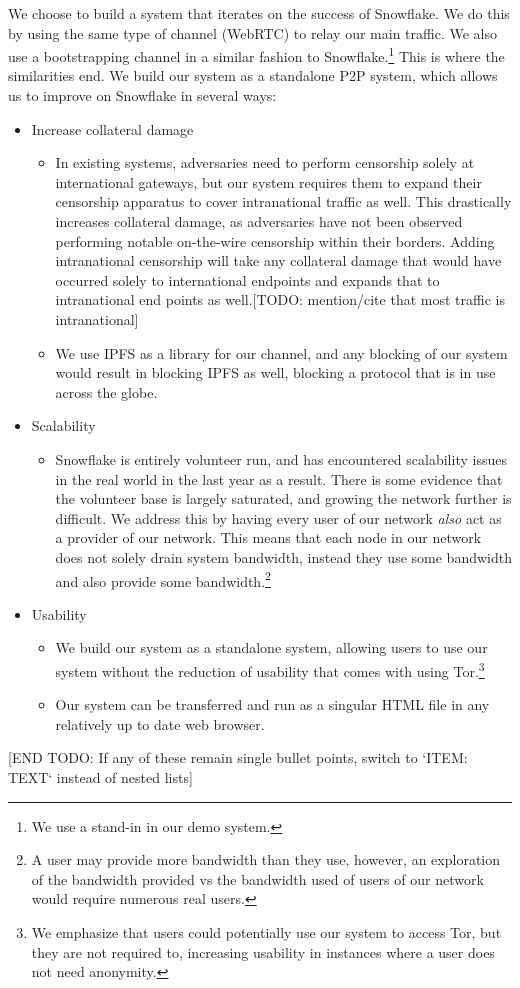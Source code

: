 \documentclass[12pt]{report}
\begin{document}
We choose to build a system that iterates on the success of Snowflake. We do this by using the same type of channel (WebRTC) to relay our main traffic. We also use a bootstrapping channel in a similar fashion to Snowflake.\footnote{We use a stand-in in our demo system.} This is where the similarities end. We build our system as a standalone P2P system, which allows us to improve on Snowflake in several ways:

\begin{itemize}
  \item Increase collateral damage
    \begin{itemize}
    \item In existing systems, adversaries need to perform censorship solely at international gateways, but our system requires them to expand their censorship apparatus to cover intranational traffic as well. This drastically increases collateral damage, as adversaries have not been observed performing notable on-the-wire censorship within their borders. Adding intranational censorship will take any collateral damage that would have occurred solely to international endpoints and expands that to intranational end points as well.[TODO: mention/cite that most traffic is intranational]
    \item We use IPFS as a library for our channel, and any blocking of our system would result in blocking IPFS as well, blocking a protocol that is in use across the globe.
    \end{itemize}
  \item Scalability
    \begin{itemize}
    \item Snowflake is entirely volunteer run, and has encountered scalability issues in the real world in the last year as a result. There is some evidence that the volunteer base is largely saturated, and growing the network further is difficult. We address this by having every user of our network \emph{also} act as a provider of our network. This means that each node in our network does not solely drain system bandwidth, instead they use some bandwidth and also provide some bandwidth.\footnote{A user may provide more bandwidth than they use, however, an exploration of the bandwidth provided vs the bandwidth used of users of our network would require numerous real users.}
    \end{itemize}
  \item Usability
    \begin{itemize}
    \item We build our system as a standalone system, allowing users to use our system without the reduction of usability that comes with using Tor.\footnote{We emphasize that users could potentially use our system to access Tor, but they are not required to, increasing usability in instances where a user does not need anonymity.}
    \item Our system can be transferred and run as a singular HTML file in any relatively up to date web browser.
    \end{itemize}
\end{itemize}
[END TODO: If any of these remain single bullet points, switch to `ITEM: TEXT` instead of nested lists]
\end{document}

